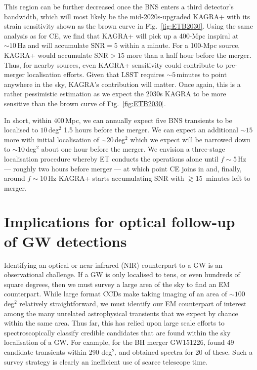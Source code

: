 \documentclass{aa}
\begin{document}
This region can be further decreased once the BNS enters a third detector's bandwidth,
which will most likely be the mid-2020s-upgraded KAGRA+ with its strain sensitivity shown as the brown curve in Fig.~\ref{fig:ETB2030}.
Using the same analysis as for CE, we find that KAGRA+ will pick up a 400-Mpc inspiral at $\sim 10\,$Hz and will accumulate $\text{SNR}=5$ within a minute. 
For a 100-Mpc source, KAGRA+ would accumulate $\text{SNR} > 15$ more than a half hour before the merger.
Thus, for nearby sources, even KAGRA+ sensitivity could contribute to pre-merger localisation efforts. Given that LSST requires $\sim 5\,$minutes to
point anywhere in the sky, KAGRA's contribution will matter.
Once again, this is a rather pessimistic estimation as we expect the 2030s KAGRA
to be more sensitive than the brown curve of Fig.~\ref{fig:ETB2030}.

In short, within 400\,Mpc, we can annually expect five BNS transients to be localised to $10\,$deg$^2$ 1.5 hours
before the merger. We can expect an additional $\sim 15$ more with initial localisation of $\sim 20\,$deg$^2$ 
which we expect will be narrowed down to $\sim10\,$deg$^2 $ about one hour before the merger.
We envision a three-stage localisation procedure whereby ET conducts the operations alone until $f\sim 5\,$Hz 
--- roughly two hours before merger --- at which point CE joins in and, finally, around $f\sim 10\,$Hz KAGRA+ starts accumulating SNR with $\gtrsim 15\,$ minutes left to merger.

\section{Implications for optical follow-up of GW detections} \label{sect:EM}
Identifying an optical or near-infrared (NIR) counterpart to a GW is an observational challenge. If a GW is only localised to tens, or even hundreds of square degrees, then we must survey a large area of the sky to find an EM counterpart. While large format CCDs make taking imaging of an area of $\sim 100\,$ deg$^2$ relatively straightforward, we must identify our EM counterpart of interest among the many unrelated astrophysical transients that we expect by chance within the same area. Thus far, this has relied upon large scale efforts to spectroscopically classify credible candidates that are found within the sky localisation of a GW. For example, for the BH merger GW151226, \cite{Smar16} found 49 candidate transients within 290 deg$^2$, and obtained spectra for 20 of these. Such a survey strategy is clearly an inefficient use of scarce telescope time.
\end{document}
